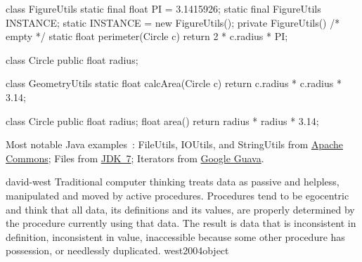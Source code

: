 \documentclass{article}
\begin{document}

\pptToc


\begin{lnSnippet}
class FigureUtils {
  static final float PI = 3.1415926;
  static final FigureUtils INSTANCE;
  static {
    INSTANCE = new FigureUtils();
  }
  private FigureUtils() { /* empty */ }
  static float perimeter(Circle c) {
    return 2 * c.radius * PI;
  }
}
\end{lnSnippet}


\begin{pptWide}{2}
{\small\begin{ffcode}
class Circle {
  public float radius;
}

class GeometryUtils {
  static float calcArea(Circle c) {
    return c.radius * c.radius * 3.14;
  }
}
\end{ffcode}
}
\par\columnbreak\par
{\small\begin{ffcode}
class Circle {
  public float radius;
  float area() {
    return radius * radius * 3.14;
  }
}
\end{ffcode}
}
\end{pptWide}
\par
Most notable Java examples~\citep{bugayenko2015blog0220}:
FileUtils, IOUtils, and StringUtils from
\href{https://commons.apache.org/}{Apache Commons};
Files from \href{https://openjdk.org/projects/jdk7/}{JDK~7};
Iterators from \href{https://github.com/google/guava}{Google Guava}.
\plush{}

\lnQuote
  {david-west}
  {Traditional computer thinking treats data as passive and helpless, manipulated and moved by active procedures. Procedures tend to be egocentric and think that all data, its definitions and its values, are properly determined by the procedure currently using that data. The result is data that is inconsistent in definition, inconsistent in value, inaccessible because some other procedure has possession, or needlessly duplicated.}
  {west2004object}
\end{document}
